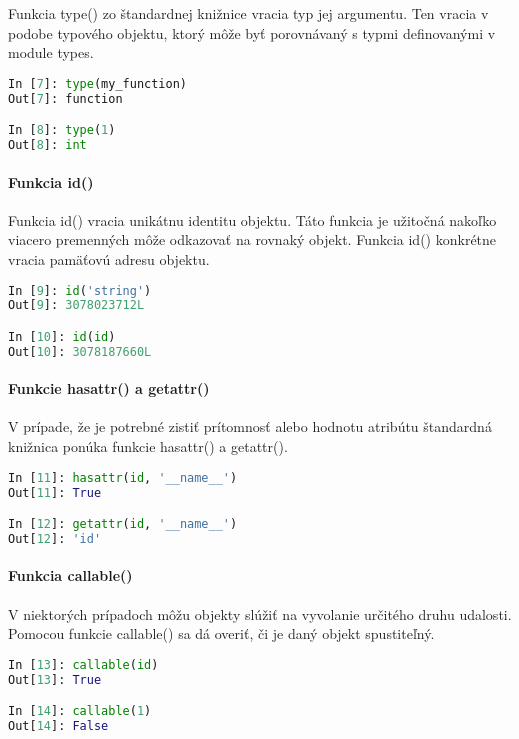 \documentclass[11pt,oneside,final]{fithesis2}
\begin{document}
		Funkcia type() zo štandardnej knižnice vracia typ jej argumentu. Ten vracia v podobe typového objektu, ktorý môže byť porovnávaný s typmi definovanými v module types.

\begin{lstlisting}[language=python]	
In [7]: type(my_function)
Out[7]: function

In [8]: type(1)
Out[8]: int
\end{lstlisting}


		\paragraph{Funkcia id()}
		
		Funkcia id() vracia unikátnu identitu objektu. Táto funkcia je užitočná nakoľko viacero premenných môže odkazovať na rovnaký objekt. Funkcia id() konkrétne vracia pamäťovú adresu objektu.

\begin{lstlisting}[language=python]	
In [9]: id('string')
Out[9]: 3078023712L

In [10]: id(id)
Out[10]: 3078187660L
\end{lstlisting}

		\paragraph{Funkcie hasattr() a getattr()}
		V prípade, že je potrebné zistiť prítomnosť alebo hodnotu atribútu štandardná knižnica ponúka funkcie hasattr() a getattr().

\begin{lstlisting}[language=python]	
In [11]: hasattr(id, '__name__')
Out[11]: True

In [12]: getattr(id, '__name__')
Out[12]: 'id'
\end{lstlisting}		

		\paragraph{Funkcia callable()}
		V niektorých prípadoch môžu objekty slúžiť na vyvolanie určitého druhu udalosti. Pomocou funkcie callable() sa dá overiť, či je daný objekt spustiteľný.

\begin{lstlisting}[language=python]	
In [13]: callable(id)
Out[13]: True

In [14]: callable(1)
Out[14]: False
\end{lstlisting}			
\end{document}
